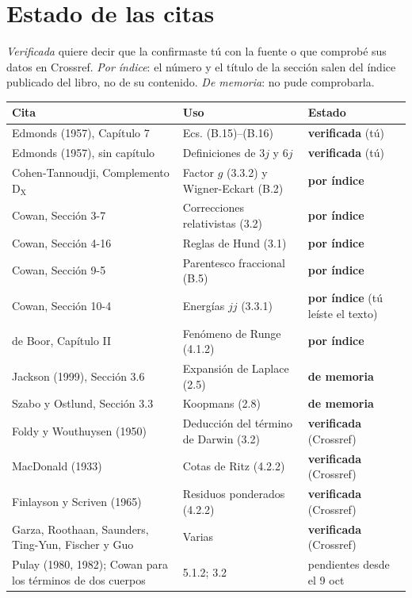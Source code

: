 \documentclass[11pt,a4paper]{article}
\newcommand{\ok}{\textcolor{green!45!black}{\textbf{verificada}}}
\newcommand{\indice}{\textcolor{orange!80!black}{\textbf{por índice}}}
\newcommand{\memoria}{\textcolor{red!70!black}{\textbf{de memoria}}}
\begin{document}
\section{Estado de las citas}
\label{sec:citas}

\emph{Verificada} quiere decir que la confirmaste tú con la fuente o que comprobé sus datos en
Crossref. \emph{Por índice}: el número y el título de la sección salen del índice publicado del libro,
no de su contenido. \emph{De memoria}: no pude comprobarla.

\begin{longtable}{L{5.6cm}L{6.3cm}L{2.6cm}}
\toprule
\textbf{Cita} & \textbf{Uso} & \textbf{Estado}\\
\midrule
\endhead
Edmonds (1957), Capítulo 7 & Ecs. (B.15)--(B.16) & \ok{} (tú)\\
Edmonds (1957), sin capítulo & Definiciones de $3j$ y $6j$ & \ok{} (tú)\\
Cohen-Tannoudji, Complemento D$_\text{X}$ & Factor $g$ (3.3.2) y Wigner-Eckart (B.2) & \indice{}\\
Cowan, Sección 3-7 & Correcciones relativistas (3.2) & \indice{}\\
Cowan, Sección 4-16 & Reglas de Hund (3.1) & \indice{}\\
Cowan, Sección 9-5 & Parentesco fraccional (B.5) & \indice{}\\
Cowan, Sección 10-4 & Energías $jj$ (3.3.1) & \indice{} (tú leíste el texto)\\
de Boor, Capítulo II & Fenómeno de Runge (4.1.2) & \indice{}\\
Jackson (1999), Sección 3.6 & Expansión de Laplace (2.5) & \memoria{}\\
Szabo y Ostlund, Sección 3.3 & Koopmans (2.8) & \memoria{}\\
Foldy y Wouthuysen (1950) & Deducción del término de Darwin (3.2) & \ok{} (Crossref)\\
MacDonald (1933) & Cotas de Ritz (4.2.2) & \ok{} (Crossref)\\
Finlayson y Scriven (1965) & Residuos ponderados (4.2.2) & \ok{} (Crossref)\\
Garza, Roothaan, Saunders, Ting-Yun, Fischer y Guo & Varias & \ok{} (Crossref)\\
Pulay (1980, 1982); Cowan para los términos de dos cuerpos & 5.1.2; 3.2 & pendientes desde el 9 oct\\
\end{longtable}
\end{document}
